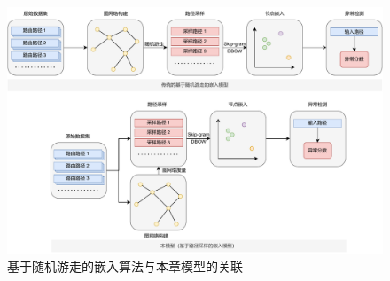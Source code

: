 \begin{figure}[h]
    \includegraphics[width=\linewidth]{chapter/c5_images/c5-compare.pdf}
    \caption{基于随机游走的嵌入算法与本章模型的关联}
    \label{c5-compare}
\end{figure}